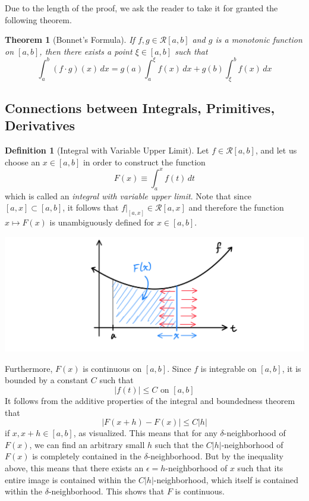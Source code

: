 \documentclass{article}
\newtheorem{theorem}{Theorem}[section]
\theoremstyle{remark}
\theoremstyle{definition}
\newtheorem{definition}{Definition}[section]
\begin{document}
Due to the length of the proof, we ask the reader to take it for granted the following theorem. 

\begin{theorem}[Bonnet's Formula]
If $f, g \in \mathcal{R}[a, b]$ and $g$ is a monotonic function on $[a, b]$, then there exists a point $\xi \in [a, b]$ such that
\[\int_a^b (f \cdot g) (x)\,dx = g(a) \int_a^\xi f(x)\,dx + g(b) \int_\xi^b f(x)\,dx\]
\end{theorem}

\subsection{Connections between Integrals, Primitives, Derivatives}
\begin{definition}[Integral with Variable Upper Limit]
Let $f \in \mathcal{R}[a, b]$, and let us choose an $x \in [a, b]$ in order to construct the function
\[F(x) \equiv \int_a^x f(t)\,dt\]
which is called an \textit{integral with variable upper limit}. Note that since $[a, x] \subset [a, b]$, it follows that $f \big|_{[a,x]} \in \mathcal{R}[a, x]$ and therefore the function $x \mapsto F(x)$ is unambiguously defined for $x \in [a, b]$. 
\begin{center}
    \includegraphics[scale=0.27]{img/Integral_with_Variable_Upper_Limit.PNG}
\end{center}
Furthermore, $F(x)$ is continuous on $[a, b]$. Since $f$ is integrable on $[a, b]$, it is bounded by a constant $C$ such that
\[|f(t)| \leq C \text{ on } [a, b]\]
It follows from the additive properties of the integral and boundedness theorem that 
\[|F(x + h) - F(x)| \leq C|h|\]
if $x, x + h \in [a, b]$, as visualized. This means that for any $\delta$-neighborhood of $F(x)$, we can find an arbitrary small $h$ such that the $C|h|$-neighborhood of $F(x)$ is completely contained in the $\delta$-neighborhood. But by the inequality above, this means that there exists an $\epsilon = h$-neighborhood of $x$ such that its entire image is contained within the $C|h|$-neighborhood, which itself is contained within the $\delta$-neighborhood. This shows that $F$ is continuous. 
\end{definition}
\end{document}
